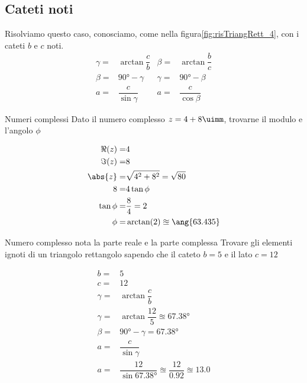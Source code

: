 \subsection{Cateti noti}
Risolviamo questo caso, conosciamo, come nella figura\nobs\vref{fig:risTriangRett_4}, con i cateti $b$ e $c$ noti.
\begin{align*}
\gamma=&\arctan\dfrac{c}{b}&\beta=&\arctan\dfrac{b}{c}\\
\beta=&\ang{90}-\gamma&\gamma=&\ang{90}-\beta\\
a=&\dfrac{c}{\sin\gamma}&a=&\dfrac{c}{\cos\beta}
\end{align*}
\begin{esempiot}{Numeri complessi}{}
Dato il numero complesso $z=4+8\uimm$, trovarne il modulo e l'angolo $\phi$
\end{esempiot}
\begin{align*}
\Re(z)=&4\\
\Im(z)=&8\\
\abs{z}=&\sqrt{4^2+8^2}=\sqrt{80}\\
8=&4\tan\phi\\
\tan\phi=&\dfrac{8}{4}=2\\
\phi=&\arctan(2)\approxeq\ang{63.435}\\
\end{align*}
\begin{esempiot}{Numero complesso nota la parte reale e la parte complessa}{}
	Trovare gli elementi ignoti di un triangolo rettangolo sapendo che  il cateto $b=5$ e il lato $c=12$
\end{esempiot}
\begin{align*}
b=&5\\
c=&12\\
\gamma=&\arctan\dfrac{c}{b}\\
\gamma=&\arctan\dfrac{12}{5}\approxeq\ang{67.38}\\
\beta=&\ang{90}-\gamma=\ang{67.38}\\
a=&\dfrac{c}{\sin\gamma}\\
a=&\dfrac{12}{\sin\ang{67.38}}\approxeq\dfrac{12}{\num{0.92}}\approxeq\num{13.0}
\end{align*}
